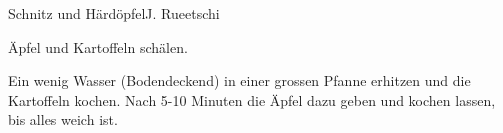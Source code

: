 
\begin{recipe}[]{Schnitz und H\"ard\"opfel}{J. Rueetschi}{}



\step
\"Apfel und Kartoffeln sch\"alen.

\step
Ein wenig Wasser (Bodendeckend) in einer grossen Pfanne erhitzen und die Kartoffeln kochen. Nach 5-10 Minuten die \"Apfel dazu geben und kochen lassen, bis alles weich ist.


\end{recipe}
